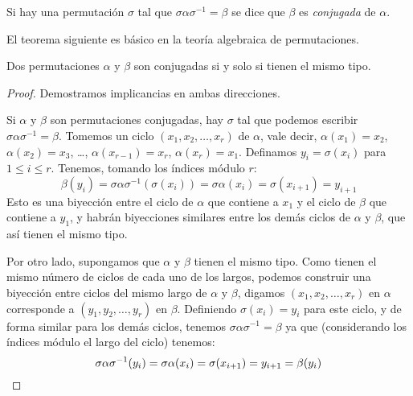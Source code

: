   \begin{definition}
    \label{def:permutacion-conjugada}
    Si hay una permutación \(\sigma\)
    tal que \(\sigma \alpha \sigma^{-1} = \beta\)
    se dice que \(\beta\) es \emph{conjugada} de \(\alpha\).
  \end{definition}
  El teorema siguiente es básico
  en la teoría algebraica de permutaciones.
  \begin{theorem}
    Dos permutaciones \(\alpha\) y \(\beta\) son conjugadas
    si y solo si tienen el mismo tipo.
  \end{theorem}
  \begin{proof}
    Demostramos implicancias en ambas direcciones.

    Si \(\alpha\) y \(\beta\) son permutaciones conjugadas,
    hay \(\sigma\)
    tal que podemos escribir \(\sigma \alpha \sigma^{-1} = \beta\).
    Tomemos un ciclo \((x_1, x_2, \dotsc, x_r)\) de \(\alpha\),
    vale decir,
    \(\alpha(x_1) = x_2\),
    \(\alpha(x_2) = x_3\), \ldots,
    \(\alpha(x_{r - 1}) = x_r\), \(\alpha(x_r) = x_1\).
    Definamos \(y_i = \sigma(x_i)\) para \(1 \le i \le r\).
    Tenemos,
    tomando los índices módulo \(r\):
    \begin{equation*}
      \beta(y_i)
	= \sigma \alpha \sigma^{-1}(\sigma(x_i))
	= \sigma \alpha (x_i)
	= \sigma(x_{i + 1})
	= y_{i + 1}
    \end{equation*}
    Esto es una biyección entre el ciclo de \(\alpha\)
    que contiene a \(x_1\)
    y el ciclo de \(\beta\) que contiene a \(y_1\),
    y habrán biyecciones similares
    entre los demás ciclos de \(\alpha\) y \(\beta\),
    que así tienen el mismo tipo.

    Por otro lado,
    supongamos que \(\alpha\) y \(\beta\) tienen el mismo tipo.
    Como tienen el mismo número de ciclos de cada uno de los largos,
    podemos construir una biyección
    entre ciclos del mismo largo de \(\alpha\) y \(\beta\),
    digamos \((x_1, x_2, \dotsc, x_r)\) en \(\alpha\)
    corresponde a \((y_1, y_2, \dotsc, y_r)\) en \(\beta\).
    Definiendo \(\sigma(x_i) = y_i\) para este ciclo,
    y de forma similar para los demás ciclos,
    tenemos \(\sigma \alpha \sigma^{-1} = \beta\) ya que
    (considerando los índices módulo el largo del ciclo)
    tenemos:
    \begin{equation*}
      \sigma \alpha \sigma^{-1}(y_i)
	= \sigma \alpha (x_i)
	= \sigma (x_{i + 1})
	= y_{i + 1}
	= \beta(y_i)
      \qedhere
    \end{equation*}
  \end{proof}

